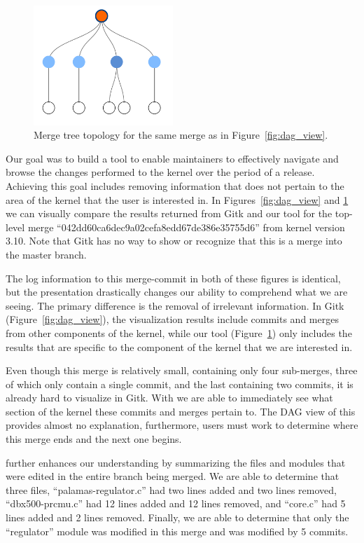 \documentclass[draft]{IEEEtran}
\begin{document}
\begin{figure}
        \centering
        \includegraphics[width=0.47\textwidth]{figures/042dd_tree.pdf}
        \caption{Merge tree topology for the same merge as in
                Figure~\ref{fig:dag_view}.}
        \label{fig:tree_view}
\end{figure}

Our goal was to build a tool to enable maintainers to effectively
navigate and browse the changes performed to the kernel over the period
of a release. Achieving this goal includes removing information that
does not pertain to the area of the kernel that the user is interested
in. In Figures~\ref{fig:dag_view} and \ref{fig:tree_view} we can
visually compare the results returned from Gitk and our tool for the
top-level merge ``042dd60ca6dec9a02cefa8edd67de386e35755d6'' from kernel
version 3.10. Note that Gitk has no way to show or recognize that this
is a merge into the master branch.

The log information to this merge-commit in both of these figures is
identical, but the presentation drastically changes our ability to
comprehend what we are seeing.  The primary difference is the removal of
irrelevant information. In Gitk (Figure~\ref{fig:dag_view}), the
visualization results include commits and merges from other components
of the kernel, while our tool (Figure~\ref{fig:tree_view}) only includes
the results that are specific to the component of the kernel that we are
interested in.

Even though this merge is relatively small, containing only four
sub-merges, three of which only contain a single commit, and the last
containing two commits, it is already hard to visualize in Gitk.  With
\tool we are able to immediately see what section of the kernel these
commits and merges pertain to. The DAG view of this provides almost no
explanation, furthermore, users must work to determine where this merge
ends and the next one begins.

\tool further enhances our understanding by summarizing the files and
modules that were edited in the entire branch being merged. We are able
to determine that three files, ``palamas-regulator.c'' had two lines
added and two lines removed, ``dbx500-prcmu.c'' had 12 lines added and
12 lines removed, and ``core.c'' had 5 lines added and 2 lines removed.
Finally, we are able to determine that only the ``regulator'' module was
modified in this merge and was modified by 5 commits.
\end{document}
